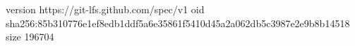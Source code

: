 version https://git-lfs.github.com/spec/v1
oid sha256:85b310776e1ef8edb1ddf5a6e35861f5410d45a2a062db5c3987e2e9b8b14518
size 196704
